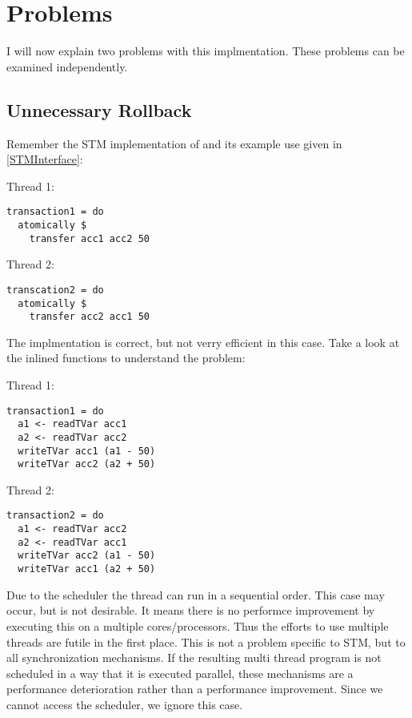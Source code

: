 \section{Problems}
I will now explain two problems with this implmentation. These problems can be examined independently.

\subsection{Unnecessary Rollback}
\label{Prob:UnRo}
Remember the STM implementation of  and its example use given in \ref{STMInterface}: 
\par\noindent
\begin{minipage}[t]{.45\textwidth}
Thread 1:
\begin{lstlisting}[frame=lrtb]
transaction1 = do
  atomically $
    transfer acc1 acc2 50
\end{lstlisting}
\end{minipage}
\hfill
\begin{minipage}[t]{.45\textwidth}
Thread 2:
\begin{lstlisting}[frame=lrtb]
transcation2 = do 
  atomically $ 
    transfer acc2 acc1 50
\end{lstlisting}
\end{minipage}
The implmentation is correct, but not verry efficient in this case. Take a look at the inlined functions to understand the 
problem:
\par\noindent
\begin{minipage}[t]{.45\textwidth}
Thread 1:
\begin{lstlisting}[frame=lrtb]
transaction1 = do
  a1 <- readTVar acc1
  a2 <- readTVar acc2
  writeTVar acc1 (a1 - 50)
  writeTVar acc2 (a2 + 50)
\end{lstlisting}
\end{minipage}
\hfill
\begin{minipage}[t]{.45\textwidth}
Thread 2:
\begin{lstlisting}[frame=lrtb]
transaction2 = do 
  a1 <- readTVar acc2
  a2 <- readTVar acc1
  writeTVar acc2 (a1 - 50)
  writeTVar acc1 (a2 + 50)
\end{lstlisting}
\end{minipage}

Due to the scheduler the thread can run in a sequential order. This case may occur, but is not desirable. It means 
there is no performce improvement by executing this on a multiple cores/processors. Thus the efforts to use multiple
threads are futile in the first place. This is not a problem specific to STM, but to all synchronization mechanisms. 
If the resulting multi thread program is not scheduled in a way that it is executed parallel, these mechanisms are a
performance deterioration rather than a performance improvement. Since we cannot access the scheduler, we ignore 
this case. 


